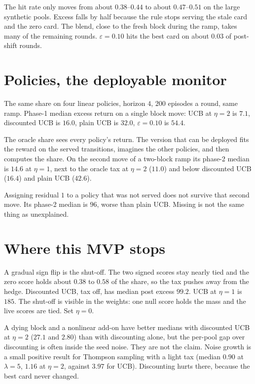 \documentclass[11pt]{article}
\begin{document}
The hit rate only moves from about \(0.38\)--\(0.44\) to about \(0.47\)--\(0.51\)
on the large synthetic pools. Excess falls by half because the rule stops
serving the stale card and the zero card. The blend, close to the fresh block
during the ramp, takes many of the remaining rounds. \(\varepsilon=0.10\) hits
the best card on about \(0.03\) of post-shift rounds.

\section{Policies, the deployable monitor}

The same share on four linear policies, horizon \(4\), \(200\) episodes a round,
same ramp. Phase-1 median excess return on a single block move:
UCB at \(\eta=2\) is \(7.1\), discounted UCB is \(16.0\), plain UCB is \(32.0\),
\(\varepsilon=0.10\) is \(54.4\).

The oracle share sees every policy's return. The version that can be deployed
fits the reward on the served transitions, imagines the other policies, and
then computes the share. On the second move of a two-block ramp its phase-2
median is \(14.6\) at \(\eta=1\), next to the oracle tax at \(\eta=2\) (\(11.0\))
and below discounted UCB (\(16.4\)) and plain UCB (\(42.6\)).

Assigning residual \(1\) to a policy that was not served does not survive that
second move. Its phase-2 median is \(96\), worse than plain UCB. Missing is not
the same thing as unexplained.

\section{Where this MVP stops}

A gradual sign flip is the shut-off. The two signed scores stay nearly tied and
the zero score holds about \(0.38\) to \(0.58\) of the share, so the tax pushes
away from the hedge. Discounted UCB, tax off, has median post excess \(99.2\).
UCB at \(\eta=1\) is \(185\). The shut-off is visible in the weights: one null
score holds the mass and the live scores are tied. Set \(\eta=0\).

A dying block and a nonlinear add-on have better medians with discounted UCB at
\(\eta=2\) (\(27.1\) and \(2.80\)) than with discounting alone, but the per-pool
gap over discounting is often inside the seed noise. They are not the claim.
Noise growth is a small positive result for Thompson sampling with a light tax
(median \(0.90\) at \(\lambda=5\), \(1.16\) at \(\eta=2\), against \(3.97\) for
UCB). Discounting hurts there, because the best card never changed.
\end{document}
